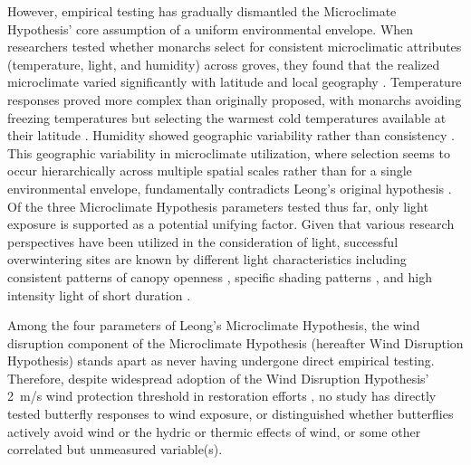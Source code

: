 \documentclass[insects,article,submit,pdftex,moreauthors]{Definitions/mdpi}
\begin{document}
However, empirical testing has gradually dismantled the Microclimate Hypothesis' core assumption of a uniform environmental envelope. When researchers tested whether monarchs select for consistent microclimatic attributes (temperature, light, and humidity) across groves, they found that the realized microclimate varied significantly with latitude and local geography \cite{sanieeHierarchyScaleInfluence2022}. Temperature responses proved more complex than originally proposed, with monarchs avoiding freezing temperatures but selecting the warmest cold temperatures available at their latitude \cite{fisherMultiScaleSpeciesDistribution2024}. Humidity showed geographic variability rather than consistency \cite{sanieeHierarchyScaleInfluence2022}. This geographic variability in microclimate utilization, where selection seems to occur hierarchically across multiple spatial scales rather than for a single environmental envelope, fundamentally contradicts Leong's original hypothesis \cite{fisherMultiScaleSpeciesDistribution2024,sanieeHierarchyScaleInfluence2022}. Of the three Microclimate Hypothesis parameters tested thus far, only light exposure is supported as a potential unifying factor. Given that various research perspectives have been utilized in the consideration of light, successful overwintering sites are known by different light characteristics including consistent patterns of canopy openness \cite{weissForestCanopyStructure1991}, specific shading patterns \cite{ibsenDensityDependenceHabitat2026}, and high intensity light of short duration \cite{sanieeHierarchyScaleInfluence2022}.

Among the four parameters of Leong's Microclimate Hypothesis, the wind disruption component of the Microclimate Hypothesis (hereafter Wind Disruption Hypothesis) stands apart as never having undergone direct empirical testing. Therefore, despite widespread adoption of the Wind Disruption Hypothesis' 2~m/s wind protection threshold in restoration efforts \cite{xercessocietyManagingMonarchsWest2018,jepsenProtectingCaliforniasButterfly2017,althouse&meadeinc.EllwoodMesaSperling2023,u.s.fishandwildlifeserviceMonarchDanausPlexippus2024,weissAlbanyHillMonarch2018,leongEvaluationManagementCalifornia2016}, no study has directly tested butterfly responses to wind exposure, or distinguished whether butterflies actively avoid wind or the hydric or thermic effects of wind, or some other correlated but unmeasured variable(s).
\end{document}
